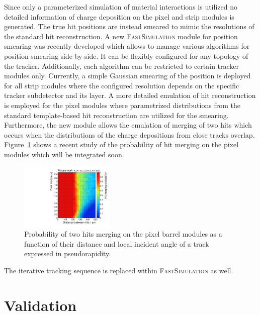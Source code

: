 \documentclass[a4paper]{jpconf}
\begin{document}
Since only a parameterized simulation of material interactions is utilized no detailed information of charge deposition on the pixel and strip modules is generated. The true hit positions are instead smeared to mimic the resolutions of the standard hit reconstruction. A new \textsc{FastSimulation} module for position smearing was recently developed which allows to manage various algorithms for position smearing side-by-side. It can be flexibly configured for any topology of the tracker. Additionally, each algorithm can be restricted to certain tracker modules only. Currently, a simple Gaussian smearing of the position is deployed for all strip modules where the configured resolution depends on the specific tracker subdetector and its layer. A more detailed emulation of hit reconstruction is employed for the pixel modules where parametrized distributions from the standard template-based hit reconstruction are utilized for the smearing. Furthermore, the new module allows the emulation of merging of two hits which occurs when the distributions of the charge depositions from close tracks overlap. Figure~\ref{fig:merge} shows a recent study of the probability of hit merging on the pixel modules which will be integrated soon.

\begin{figure}[htbp]
\begin{center}
\includegraphics[width=0.4\textwidth]{figures/merge.pdf}
\caption{\label{fig:merge}Probability of two hits merging on the pixel barrel modules as a function of their distance and local incident angle of a track expressed in pseudorapidity.}
\end{center}
\end{figure}

The iterative tracking sequence is replaced within \textsc{FastSimulation} as well.


\section{Validation}
\end{document}
